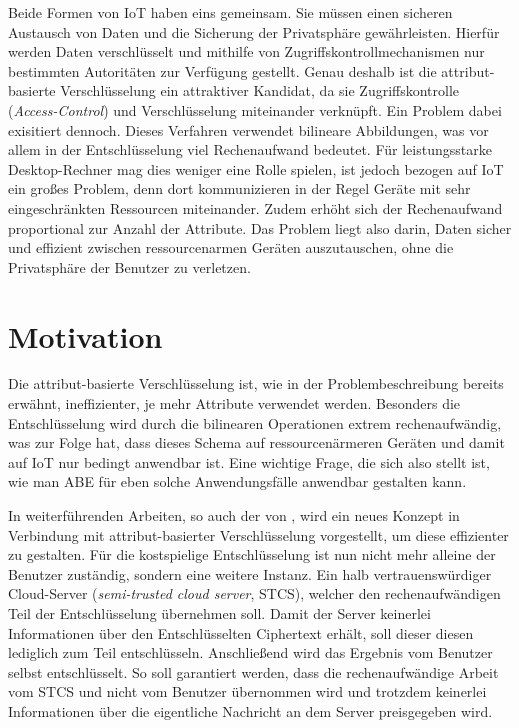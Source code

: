 \documentclass{hsflensburg}
\begin{document}
	Beide Formen von IoT haben eins gemeinsam. Sie müssen einen sicheren Austausch
	von Daten und die Sicherung der Privatsphäre gewährleisten. Hierfür werden
	Daten verschlüsselt und mithilfe von Zugriffskontrollmechanismen nur
	bestimmten Autoritäten zur Verfügung gestellt. Genau deshalb ist die
	attribut-basierte Verschlüsselung ein attraktiver Kandidat, da sie
	Zugriffskontrolle (\textit{Access-Control}) und Verschlüsselung miteinander
	verknüpft. Ein Problem dabei exisitiert dennoch. Dieses Verfahren verwendet
	bilineare Abbildungen, was vor allem in der Entschlüsselung viel Rechenaufwand
	bedeutet. Für leistungsstarke Desktop-Rechner mag dies weniger eine Rolle
	spielen, ist jedoch bezogen auf IoT ein großes Problem, denn dort
	kommunizieren in der Regel Geräte mit sehr eingeschränkten Ressourcen
	miteinander. Zudem erhöht sich der Rechenaufwand proportional zur Anzahl
	der Attribute. Das Problem liegt also darin, Daten sicher und effizient
	zwischen ressourcenarmen Geräten auszutauschen, ohne die Privatsphäre der
	Benutzer zu verletzen.

	\section{Motivation}
	Die attribut-basierte Verschlüsselung ist, wie in der Problembeschreibung
	bereits erwähnt, ineffizienter, je mehr Attribute verwendet werden. Besonders
	die Entschlüsselung wird durch die bilinearen Operationen extrem
	rechenaufwändig, was zur Folge hat, dass dieses Schema auf ressourcenärmeren
	Geräten und damit auf IoT nur bedingt anwendbar ist. Eine wichtige Frage, die
	sich also stellt ist, wie man ABE für eben solche Anwendungsfälle anwendbar
	gestalten kann.

	In weiterführenden Arbeiten, so auch der von \cite{green}, wird ein neues
	Konzept in Verbindung mit attribut-basierter Verschlüsselung vorgestellt, um
	diese effizienter zu gestalten. Für die kostspielige Entschlüsselung ist nun
	nicht mehr alleine der Benutzer zuständig, sondern eine weitere Instanz. Ein
	halb vertrauenswürdiger Cloud-Server (\textit{semi-trusted cloud server},
	STCS), welcher den rechenaufwändigen Teil der Entschlüsselung übernehmen
	soll. Damit der Server keinerlei Informationen über den Entschlüsselten
	Ciphertext erhält, soll dieser diesen lediglich zum Teil entschlüsseln.
	Anschließend wird das Ergebnis vom Benutzer selbst entschlüsselt. So soll
	garantiert werden, dass die rechenaufwändige Arbeit vom STCS und nicht vom
	Benutzer übernommen wird und trotzdem keinerlei Informationen über die
	eigentliche Nachricht an dem Server preisgegeben wird.
\end{document}
